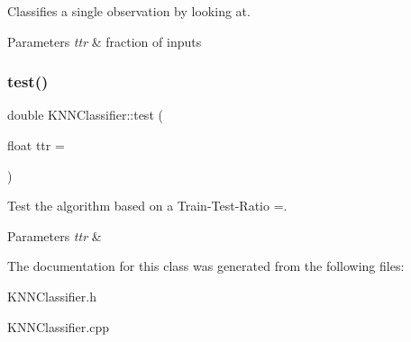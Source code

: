 Classifies a single observation by looking at. 


\begin{DoxyParams}{Parameters}
{\em ttr} & fraction of inputs \\
\hline
\end{DoxyParams}
\mbox{\label{classKNNClassifier_ac270d2fa42936ae039b3ed9cde3e7ce5}} 
\subsubsection{\texorpdfstring{test()}{test()}}
{\footnotesize\ttfamily double K\+N\+N\+Classifier\+::test (\begin{DoxyParamCaption}\item[{float}]{ttr = {} }\end{DoxyParamCaption})}



Test the algorithm based on a Train-\/\+Test-\/\+Ratio =. 


\begin{DoxyParams}{Parameters}
{\em ttr} & \\
\hline
\end{DoxyParams}


The documentation for this class was generated from the following files\+:\begin{DoxyCompactItemize}
\item 
K\+N\+N\+Classifier.\+h\item 
K\+N\+N\+Classifier.\+cpp\end{DoxyCompactItemize}
